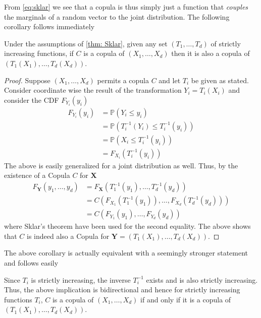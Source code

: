 \documentclass[../Thesis.tex]{subfiles}
\begin{document}
From \autoref{eq:sklar} we see that a copula is thus simply just a function that \textit{couples} the marginals of a random vector to the joint distribution. The following corollary follows immediately
\begin{corollary} \label{coro: Coordinate transformation}
    Under the assumptions of \autoref{thm: Sklar}, given any set $(T_1, \dots, T_d)$ of strictly increasing functions, if $C$ is a copula of $(X_1,\dots, X_d)$ then it is also a copula of $(T_1(X_1), \dots, T_d(X_d))$.
\end{corollary}
\begin{proof}
    Suppose $(X_1 , \dots , X_d)$ permits a copula $C$ and let $T_i$ be given as stated. Consider coordinate wise the result of the transformation $Y_i = T_i(X_i)$ and consider the CDF $F_{Y_i}(y_i)$
    \begin{align*}
        F_{Y_i}(y_i) & = \mathbb{P}\left(Y_i \leq y_i\right)                      \\
                     & = \mathbb{P}\left(T_i^{-1}(Y_i) \leq T_i^{-1}(y_i)\right)  \\
                     & = \mathbb{P}\left(X_i \leq T_i^{-1}\left(y_i\right)\right) \\
                     & = F_{X_i}\left(T_i^{-1}\left(y_i\right)\right)
    \end{align*}
    The above is easily generalized for a joint distribution as well. Thus, by the existence of a Copula $C$ for $\boldsymbol{X}$
    \begin{align*}
        F_{\boldsymbol Y}(y_1, \dots, y_d) & = F_{\boldsymbol X} \left(T_1^{-1}\left(y_1\right),\dots , T_d^{-1}\left(y_d\right)\right)   \\
                                           & = C\left( F_{X_1}(T_1^{-1}\left(y_1\right)), \dots, F_{X_d}(T_d^{-1}\left(y_d\right))\right) \\
                                           & = C\left( F_{Y_1}(y_1), \dots, F_{Y_d}(y_d)\right)
    \end{align*}
    where Sklar's theorem have been used for the second equality. The above shows that $C$ is indeed also a Copula for $\boldsymbol Y = \left(T_1(X_1), \dots, T_d(X_d)\right)$.
\end{proof}
The above corollary is actually equivalent with a seemingly stronger statement and follows easily
\begin{proposition}
    Since $T_i$ is strictly increasing, the inverse $T_i^{-1}$ exists and is also strictly increasing. Thus, the above implication is bidirectional and hence for strictly increasing functions $T_i$, $C$ is a copula of $\left(X_1,\dots,X_d\right)$ if and only if it is a copula of $\left(T_1(X_1),\dots, T_d(X_d)\right)$.
\end{proposition}
\end{document}
